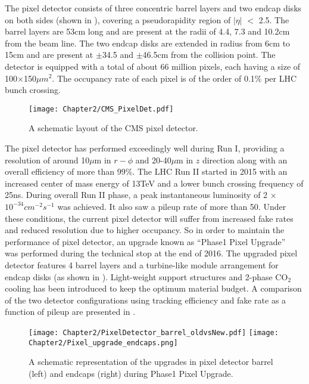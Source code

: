The pixel detector consists of three concentric barrel layers and two endcap disks on both sides (shown in \fig{\ref{fig:CMS_PixelDet}}),
covering a pseudorapidity region of $|\eta|$ $<$ 2.5. The barrel layers are 
53\unit{cm} long and are present at the radii of 4.4, 7.3 and 10.2\unit{cm} from the beam line. The two endcap disks are extended in radius from 6\unit{cm} to 15\unit{cm}
and are present at $\pm$34.5 and $\pm$46.5\unit{cm} from the collision point. The detector is equipped with a total of about 66 million pixels, each
having a size of 100$\times$150${\mu{m}}^{2}$.
The occupancy rate of each pixel is of the order of 0.1$\%$ per LHC bunch crossing.  

\begin{figure}[h]
\begin{center}
\texttt{[image: Chapter2/CMS\_PixelDet.pdf]}
\caption{A schematic layout of the CMS pixel detector.}
\label{fig:CMS_PixelDet}
\end{center}
\end{figure}

The pixel detector has performed exceedingly well during Run I, providing a resolution of
around 10{$\mu${m}} in $r-\phi$ and 20-40{$\mu${m}} in $z$
direction along with an overall efficiency of more than 99$\%$. The LHC Run II started in 2015 with an increased center of mass energy of 13\unit{TeV}
and a lower bunch crossing frequency of 25\unit{ns}. During overall Run II phase,
a peak instantaneous luminosity of 2 $\times$ $10^{-34}\unit{{cm}^{-2}{s}^{-1}}$ was achieved.
It also saw a pileup rate of more than 50. Under these conditions, the current pixel detector will suffer from increased fake rates and reduced resolution
due to higher occupancy. So in order to maintain the performance of pixel detector, an upgrade known as
``Phase1 Pixel Upgrade''~\cite{CMS:2012sda,1748-0221-9-03-C03041} was
performed during the technical stop at the end of 2016. The upgraded pixel detector features 4 barrel layers and a turbine-like module arrangement for endcap
disks (as shown in \fig{\ref{fig:Pixel_upgrade}}). Light-weight support structures and 2-phase CO$_{2}$ cooling has been introduced to keep the optimum material budget.  
A comparison of the two detector configurations using tracking efficiency and fake rate as a function of pileup are presented in \fig{\ref{fig:Pixel_upgrade_effects}}.

\begin{figure}[h]
\begin{center}
\texttt{[image: Chapter2/PixelDetector\_barrel\_oldvsNew.pdf]}
\texttt{[image: Chapter2/Pixel\_upgrade\_endcaps.png]}
\caption{A schematic representation of the upgrades in pixel detector barrel (left) and endcaps (right) during Phase1 Pixel Upgrade.}
\label{fig:Pixel_upgrade}
\end{center}
\end{figure}
\vspace{-0.3in}


